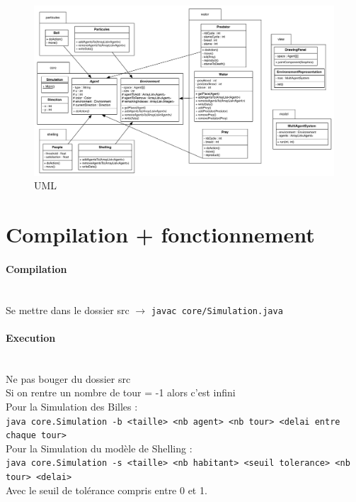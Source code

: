 \documentclass[a4paper,10pt]{article}
\begin{document}
\begin{figure}[ht]
\begin{center}
	\includegraphics[width=15cm]{uml/sci_uml_tp2.pdf}
\end{center}
	\caption{UML}
	\label{uml}
\end{figure}

\section{Compilation + fonctionnement}
 
\paragraph{Compilation} ~\\
Se mettre dans le dossier src $\rightarrow$ \verb&javac core/Simulation.java&

\paragraph{Execution} ~\\
Ne pas bouger du dossier src \\
Si on rentre un nombre de tour = -1 alors c'est infini \\

Pour la Simulation des Billes : \\ 
\verb&java core.Simulation -b <taille> <nb agent> <nb tour> <delai entre chaque tour>& \\

Pour la Simulation du mod\`ele de Shelling : \\ 
\verb&java core.Simulation -s <taille> <nb habitant> <seuil tolerance> <nb tour> <delai>& \\
Avec le seuil de tol\'erance compris entre 0 et 1. \\
\end{document}
